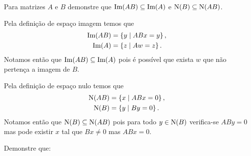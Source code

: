 \begin{questions}
    \question Para matrizes $A$ e $B$ demonstre que $\text{Im} (A B) \subseteq \text{Im} (A)$ e $\text{N} (B) \subseteq \text{N} (A B)$.
    \begin{solution}
        Pela defini\c{c}\~{a}o de espa\c{c}o imagem temos que
        \begin{align*}
            \text{Im} (A B) &= \left\{ y \mid A B x = y \right\}, \\
            \text{Im} (A) &= \left\{ z \mid A w = z \right\}.
        \end{align*}
        Notamos ent\~{a}o que $\text{Im} (A B) \subseteq \text{Im} (A)$ pois \'{e} poss\'{i}vel que exista $w$ que n\~{a}o perten\c{c}a a imagem de $B$.

        Pela defini\c{c}\~{a}o de espa\c{c}o nulo temos que
        \begin{align*}
            \text{N} (A B) &= \left\{ x \mid A B x = 0 \right\}, \\
            \text{N} (B) &= \left\{ y \mid B y = 0 \right\}.
        \end{align*}
        Notamos ent\~{a}o que $\text{N} (B) \subseteq \text{N} (A B)$ pois para todo $y \in \text{N} (B)$ verifica-se $A B y = 0$ mas pode existir $x$ tal que $B x \neq 0$ mas $ A B x = 0$.
    \end{solution}

    \question Demonstre que:
\end{questions}
